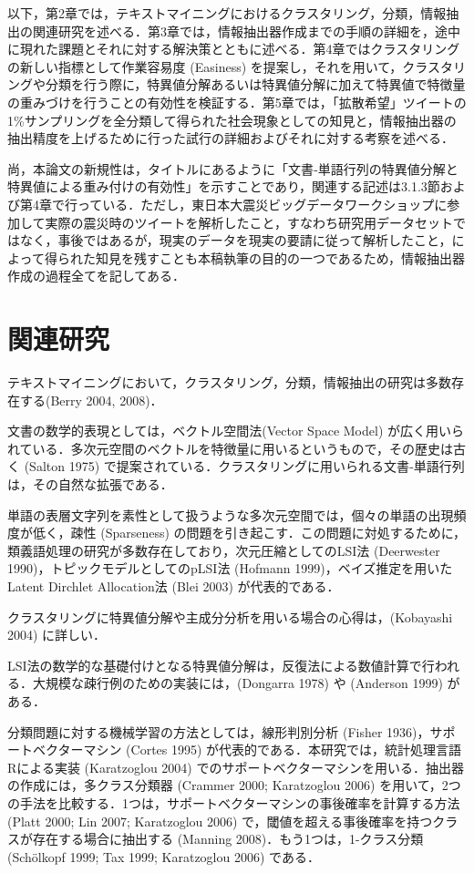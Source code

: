 \documentclass[japanese]{jnlp_1.4}
\begin{document}
以下，第2章では，テキストマイニングにおけるクラスタリング，分類，情報抽出の関連研究を述べる．第3章では，情報抽出器作成までの手順の詳細を，途中に現れた課題とそれに対する解決策とともに述べる．第4章ではクラスタリングの新しい指標として作業容易度 (Easiness) を提案し，それを用いて，クラスタリングや分類を行う際に，特異値分解あるいは特異値分解に加えて特異値で特徴量の重みづけを行うことの有効性を検証する．第5章では，「拡散希望」ツイートの1\%サンプリングを全分類して得られた社会現象としての知見と，情報抽出器の抽出精度を上げるために行った試行の詳細およびそれに対する考察を述べる．

尚，本論文の新規性は，タイトルにあるように「文書‐単語行列の特異値分解と特異値による重み付けの有効性」を示すことであり，関連する記述は3.1.3節および第4章で行っている．ただし，東日本大震災ビッグデータワークショップに参加して実際の震災時のツイートを解析したこと，すなわち研究用データセットではなく，事後ではあるが，現実のデータを現実の要請に従って解析したこと，によって得られた知見を残すことも本稿執筆の目的の一つであるため，情報抽出器作成の過程全てを記してある．



\section{関連研究}

テキストマイニングにおいて，クラスタリング，分類，情報抽出の研究は多数存在する(Berry 2004, 2008)．

文書の数学的表現としては，ベクトル空間法(Vector Space Model) が広く用いられている．多次元空間のベクトルを特徴量に用いるというもので，その歴史は古く (Salton 1975) で提案されている．クラスタリングに用いられる文書‐単語行列は，その自然な拡張である．

単語の表層文字列を素性として扱うような多次元空間では，個々の単語の出現頻度が低く，疎性 (Sparseness) の問題を引き起こす．この問題に対処するために，類義語処理の研究が多数存在しており，次元圧縮としてのLSI法 (Deerwester 1990)，トピックモデルとしてのpLSI法 (Hofmann 1999)，ベイズ推定を用いたLatent 
Dirchlet Allocation法 (Blei 2003) が代表的である．

クラスタリングに特異値分解や主成分分析を用いる場合の心得は，(Kobayashi 2004) に詳しい．

LSI法の数学的な基礎付けとなる特異値分解は，反復法による数値計算で行われる．大規模な疎行例のための実装には，(Dongarra 1978) や (Anderson 1999) がある．

分類問題に対する機械学習の方法としては，線形判別分析 (Fisher 1936)，サポートベクターマシン (Cortes 1995) が代表的である．本研究では，統計処理言語Rによる実装 (Karatzoglou 2004) でのサポートベクターマシンを用いる．抽出器の作成には，多クラス分類器 (Crammer 2000; Karatzoglou 2006) を用いて，2つの手法を比較する．1つは，サポートベクターマシンの事後確率を計算する方法 (Platt 2000; Lin 2007; Karatzoglou 2006) で，閾値を超える事後確率を持つクラスが存在する場合に抽出する (Manning 2008)．もう1つは，1-クラス分類 (Sch\"{o}lkopf 1999; Tax 1999; Karatzoglou 2006) である．
\end{document}
